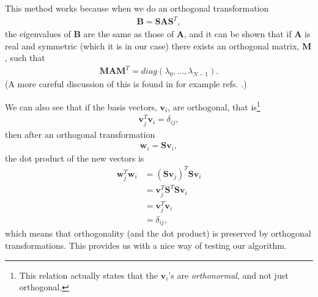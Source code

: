 \documentclass[12pt, a4paper]{article}
\begin{document}
This method works because when we do an orthogonal transformation 
\begin{align*}
\mathbf{B} = \mathbf{SAS}^T, 
\end{align*}
the eigenvalues of $\mathbf{B}$ are the same as those of $\mathbf{A}$, and
 it can be shown that \cite{Matrix Comp} if $\mathbf{A}$ is real and symmetric
(which it is in our case) there exists an orthogonal matrix, $\mathbf{M}$, such that 
\begin{align*}
\mathbf{MAM}^T = diag(\lambda_0,\dots,\lambda_{N-1}).  
\end{align*} 
(A more careful discussion of this is found in for example refs. \cite{Matrix Comp, Lecture Notes}.) 

We can also see that if the basis vectors, $\mathbf{v}_i$, are orthogonal, that is\footnote{This relation 
actually states that the $\mathbf{v}_i$'s are \textit{orthonormal}, and not just orthogonal.} 
\begin{align*}
\mathbf{v}_j^T\mathbf{v}_i = \delta_{ij}, 
\end{align*}
then after an orthogonal transformation 
\begin{align*}
\mathbf{w}_i = \mathbf{Sv}_i,  
\end{align*} 
the dot product of the new vectors is 
\begin{align*}
\mathbf{w}_j^T\mathbf{w}_i & = (\mathbf{Sv}_j)^T \mathbf{Sv}_i \\
						   & = \mathbf{v}_j^T\mathbf{S}^T \mathbf{Sv}_i \\ 
						   & = \mathbf{v}_j^T\mathbf{v}_i \\ 
						   & = \delta_{ij}, 
\end{align*}
which means that orthogonality (and the dot product) is preserved by orthogonal transformations. This 
provides us with a nice way of testing our algorithm. 
\end{document}
